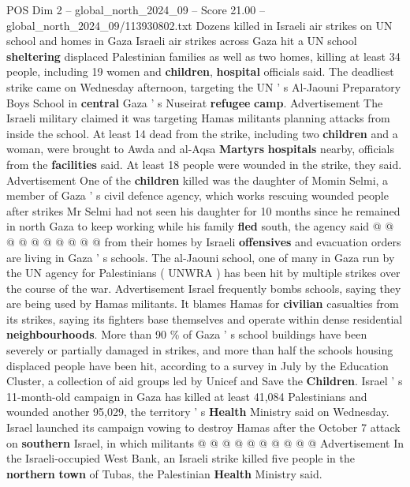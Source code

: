 \begin{textsample}{POS Dim 2 – global\_north\_2024\_09 – Score 21.00 – global\_north\_2024\_09/113930802.txt}  \label{ex:f2_pos_417}
Dozens killed in Israeli air strikes on UN school and homes in Gaza Israeli air strikes across Gaza hit a UN school \textbf{sheltering} displaced Palestinian families as well as two homes, killing at least 34 people, including 19 women and \textbf{children}, \textbf{hospital} officials said.
The deadliest strike came on Wednesday afternoon, targeting the UN ' s Al-Jaouni Preparatory Boys School in \textbf{central} Gaza ' s Nuseirat \textbf{refugee} \textbf{camp}.
Advertisement The Israeli military claimed it was targeting Hamas militants planning attacks from inside the school.
At least 14 dead from the strike, including two \textbf{children} and a woman, were brought to Awda and al-Aqsa \textbf{Martyrs} \textbf{hospitals} nearby, officials from the \textbf{facilities} said.
At least 18 people were wounded in the strike, they said.
Advertisement One of the \textbf{children} killed was the daughter of Momin Selmi, a member of Gaza ' s civil defence agency, which works rescuing wounded people after strikes Mr Selmi had not seen his daughter for 10 months since he remained in north Gaza to keep working while his family \textbf{fled} south, the agency said @ @ @ @ @ @ @ @ @ @ from their homes by Israeli \textbf{offensives} and evacuation orders are living in Gaza ' s schools.
The al-Jaouni school, one of many in Gaza run by the UN agency for Palestinians ( UNWRA ) has been hit by multiple strikes over the course of the war.
Advertisement Israel frequently bombs schools, saying they are being used by Hamas militants.
It blames Hamas for \textbf{civilian} casualties from its strikes, saying its fighters base themselves and operate within dense residential \textbf{neighbourhoods}.
More than 90 \% of Gaza ' s school buildings have been severely or partially damaged in strikes, and more than half the schools housing displaced people have been hit, according to a survey in July by the Education Cluster, a collection of aid groups led by Unicef and Save the \textbf{Children}.
Israel ' s 11-month-old campaign in Gaza has killed at least 41,084 Palestinians and wounded another 95,029, the territory ' s \textbf{Health} Ministry said on Wednesday.
Israel launched its campaign vowing to destroy Hamas after the October 7 attack on \textbf{southern} Israel, in which militants @ @ @ @ @ @ @ @ @ @ Advertisement In the Israeli-occupied West Bank, an Israeli strike killed five people in the \textbf{northern} \textbf{town} of Tubas, the Palestinian \textbf{Health} Ministry said.

\end{textsample}
